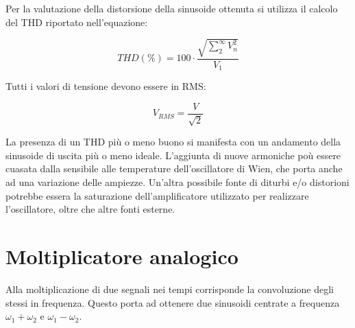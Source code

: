 \documentclass[titlepage]{report}
\begin{document}
	Per la valutazione della distorsione della sinusoide ottenuta si utilizza il calcolo del THD riportato nell'equazione:
	
	\begin{equation}
		\label{eq:thd}
		THD (\%) = 100 \cdot \frac{\sqrt{\sum_{2}^{\infty} V_{n}^2}}{V_1}
	\end{equation}

	Tutti i valori di tensione devono essere in RMS: 
	
	\begin{equation}
		\label{eq:Vrms}
		V_{RMS} = \frac{V}{\sqrt{2}}
	\end{equation}

	La presenza di un THD più o meno buono si manifesta con un andamento della sinusoide di uscita più o meno ideale. L'aggiunta di nuove armoniche poù essere cuasata dalla sensibile alle temperature dell'oscillatore di Wien, che porta anche ad una variazione delle ampiezze. Un'altra possibile fonte di diturbi e/o distorioni potrebbe essera la saturazione dell'amplificatore utilizzato per realizzare l'oscillatore, oltre che altre fonti esterne.


	
	
		
\newpage
\section{Moltiplicatore analogico}
	Alla moltiplicazione di due segnali nei tempi corrisponde la convoluzione degli stessi in frequenza. Questo porta ad ottenere due sinusoidi centrate a frequenza $\omega_1 + \omega_2$ e $\omega_1 - \omega_2$.
	
\end{document}
